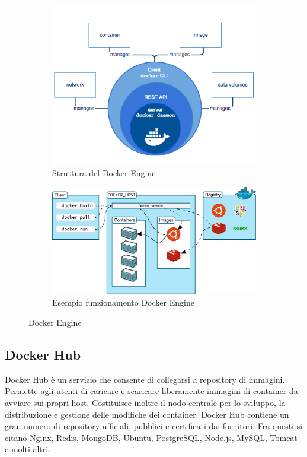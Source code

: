 \begin{figure}[h]
    \begin{subfigure}{0.4\textwidth}
        \centering
        \includegraphics[width=\textwidth]{immagini/engine-components-flow.png}
        \caption{Struttura del Docker Engine}
        \label{fig:docker_engine_a}
    \end{subfigure}
    \begin{subfigure}{0.6\textwidth}
        \centering
        \includegraphics[width=\textwidth]{immagini/architecture.png}
        \caption{Esempio funzionamento Docker Engine}
        \label{fig:docker_engine_b}
    \end{subfigure}
    \caption{Docker Engine}
    \label{fig:docker_engine}
\end{figure}

\subsection{Docker Hub}\label{docker-hub}
Docker Hub è un servizio che consente di collegarsi a repository di immagini. Permette agli utenti di caricare e scaricare liberamente immagini di container da avviare sui propri host. Costituisce inoltre il nodo centrale per lo sviluppo, la distribuzione e gestione delle modifiche dei container. Docker Hub contiene un gran numero di repository ufficiali, pubblici e certificati dai fornitori. Fra questi si citano Nginx, Redis, MongoDB, Ubuntu, PostgreSQL, Node.js, MySQL, Tomcat e molti altri.

